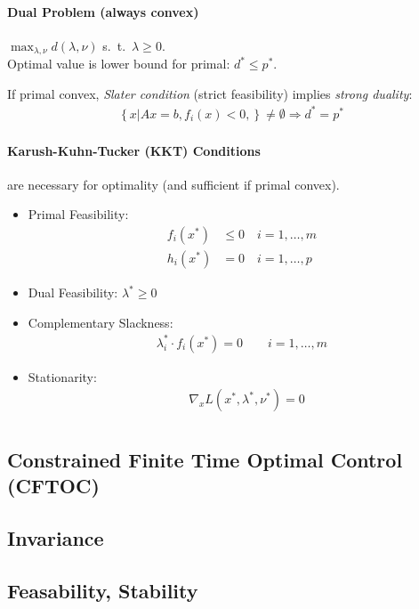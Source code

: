 \documentclass[landscape,a4paper,8pt]{scrartcl}
\begin{document}
\begin{multicols*}{3}
\paragraph{Dual Problem (always convex)} 
$\max_{\lambda,\nu} d(\lambda,\nu)$ s.\ t.\ $\lambda \geq 0$. \\
Optimal value is lower bound for primal: $d^* \leq p^*$.

If primal convex, \emph{Slater condition} (strict feasibility) implies \emph{strong duality}:
\begin{align*}
	\left\{x \left| \right. Ax=b, f_i(x)<0, \right\} \neq \emptyset \Rightarrow d^*  = p^*
\end{align*}

\paragraph{Karush-Kuhn-Tucker (KKT) Conditions}
are necessary for optimality (and sufficient if primal convex).
\begin{itemize}
	\item Primal Feasibility:
		\begin{align*}
			f_i(x^*) &\leq 0 \quad i=1,\dots,m\\
			h_i(x^*) &=0 \quad i=1,\dots,p
		\end{align*}
	\item Dual Feasibility:  $\lambda^* \geq 0$
	\item Complementary Slackness:
		\begin{align*}
			\lambda_i^* \cdot f_i(x^*) = 0 \quad \quad i=1,\dots,m
		\end{align*}
	\item Stationarity:
		\begin{align*}
			&\nabla_x L(x^*,\lambda^*,\nu^*) =0 \\
		\end{align*}
\end{itemize}

\subsection{Constrained Finite Time Optimal Control (CFTOC)}

\subsection{Invariance}
\subsection{Feasability, Stability}


\end{multicols*}
\end{document}
